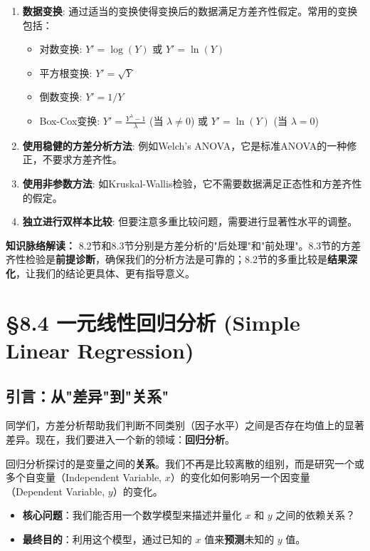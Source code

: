 \documentclass[12pt, a4paper]{amsart}
\begin{document}
\begin{enumerate}
    \item \textbf{数据变换}: 通过适当的变换使得变换后的数据满足方差齐性假定。常用的变换包括：
    \begin{itemize}
        \item 对数变换: $Y' = \log(Y)$ 或 $Y' = \ln(Y)$
        \item 平方根变换: $Y' = \sqrt{Y}$
        \item 倒数变换: $Y' = 1/Y$
        \item Box-Cox变换: $Y' = \frac{Y^\lambda - 1}{\lambda}$ (当 $\lambda \neq 0$) 或 $Y' = \ln(Y)$ (当 $\lambda = 0$)
    \end{itemize}
    \item \textbf{使用稳健的方差分析方法}: 例如Welch's ANOVA，它是标准ANOVA的一种修正，不要求方差齐性。
    \item \textbf{使用非参数方法}: 如Kruskal-Wallis检验，它不需要数据满足正态性和方差齐性的假定。
    \item \textbf{独立进行双样本比较}: 但要注意多重比较问题，需要进行显著性水平的调整。
\end{enumerate}

\textbf{知识脉络解读：} 8.2节和8.3节分别是方差分析的"后处理"和"前处理"。8.3节的方差齐性检验是\textbf{前提诊断}，确保我们的分析方法是可靠的；8.2节的多重比较是\textbf{结果深化}，让我们的结论更具体、更有指导意义。

\newpage
\section{§8.4 一元线性回归分析 (Simple Linear Regression)}

\subsection{引言：从"差异"到"关系"}
同学们，方差分析帮助我们判断不同类别（因子水平）之间是否存在均值上的显著差异。现在，我们要进入一个新的领域：\textbf{回归分析}。

回归分析探讨的是变量之间的\textbf{关系}。我们不再是比较离散的组别，而是研究一个或多个自变量（Independent Variable, $x$）的变化如何影响另一个因变量（Dependent Variable, $y$）的变化。

\begin{itemize}
    \item \textbf{核心问题}：我们能否用一个数学模型来描述并量化 $x$ 和 $y$ 之间的依赖关系？
    \item \textbf{最终目的}：利用这个模型，通过已知的 $x$ 值来\textbf{预测}未知的 $y$ 值。
\end{itemize}
\end{document}
